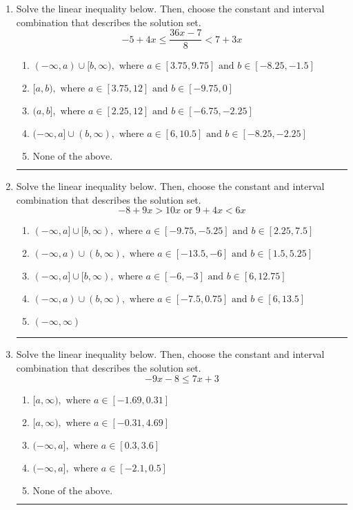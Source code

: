 \documentclass[14pt]{extbook}
\newcommand{\litem}[1]{\item#1\hspace*{-1cm}\rule{\textwidth}{0.4pt}}
\begin{document}
\begin{enumerate}
{\begin{enumerate}[label=\Alph*.]
\end{enumerate} }
\litem{
Solve the linear inequality below. Then, choose the constant and interval combination that describes the solution set.\[ -5 + 4 x \leq \frac{36 x - 7}{8} < 7 + 3 x \]\begin{enumerate}[label=\Alph*.]
\item \( (-\infty, a) \cup [b, \infty), \text{ where } a \in [3.75, 9.75] \text{ and } b \in [-8.25, -1.5] \)
\item \( [a, b), \text{ where } a \in [3.75, 12] \text{ and } b \in [-9.75, 0] \)
\item \( (a, b], \text{ where } a \in [2.25, 12] \text{ and } b \in [-6.75, -2.25] \)
\item \( (-\infty, a] \cup (b, \infty), \text{ where } a \in [6, 10.5] \text{ and } b \in [-8.25, -2.25] \)
\item \( \text{None of the above.} \)

\end{enumerate} }
\litem{
Solve the linear inequality below. Then, choose the constant and interval combination that describes the solution set.\[ -8 + 9 x > 10 x \text{ or } 9 + 4 x < 6 x \]\begin{enumerate}[label=\Alph*.]
\item \( (-\infty, a] \cup [b, \infty), \text{ where } a \in [-9.75, -5.25] \text{ and } b \in [2.25, 7.5] \)
\item \( (-\infty, a) \cup (b, \infty), \text{ where } a \in [-13.5, -6] \text{ and } b \in [1.5, 5.25] \)
\item \( (-\infty, a] \cup [b, \infty), \text{ where } a \in [-6, -3] \text{ and } b \in [6, 12.75] \)
\item \( (-\infty, a) \cup (b, \infty), \text{ where } a \in [-7.5, 0.75] \text{ and } b \in [6, 13.5] \)
\item \( (-\infty, \infty) \)

\end{enumerate} }
\litem{
Solve the linear inequality below. Then, choose the constant and interval combination that describes the solution set.\[ -9x -8 \leq 7x + 3 \]\begin{enumerate}[label=\Alph*.]
\item \( [a, \infty), \text{ where } a \in [-1.69, 0.31] \)
\item \( [a, \infty), \text{ where } a \in [-0.31, 4.69] \)
\item \( (-\infty, a], \text{ where } a \in [0.3, 3.6] \)
\item \( (-\infty, a], \text{ where } a \in [-2.1, 0.5] \)
\item \( \text{None of the above}. \)


\end{enumerate}}
\end{enumerate}
\end{document}
